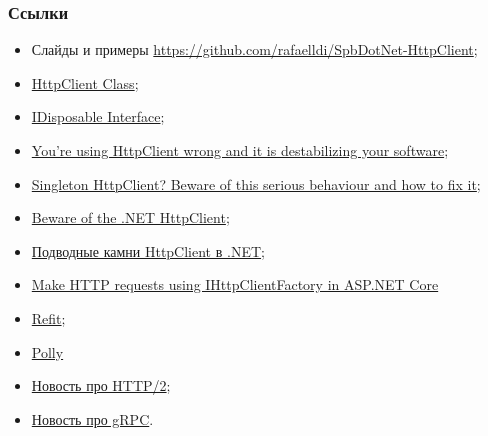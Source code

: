 \documentclass{beamer}
\begin{document}
\begin{frame}
\frametitle{Ссылки}
\begin{itemize}
	\item Слайды и примеры \href{https://github.com/rafaelldi/SpbDotNet-HttpClient}{https://github.com/rafaelldi/SpbDotNet-HttpClient};
	\item \href{https://docs.microsoft.com/en-us/dotnet/api/system.net.http.httpclient?view=netcore-2.2}{HttpClient Class};
	\item \href{https://docs.microsoft.com/en-us/dotnet/api/system.idisposable?view=netcore-2.2}{IDisposable Interface};
	\item \href{https://aspnetmonsters.com/2016/08/2016-08-27-httpclientwrong/}{You're using HttpClient wrong and it is destabilizing your software};
	\item \href{https://byterot.blogspot.com/2016/07/singleton-httpclient-dns.html}{Singleton HttpClient? Beware of this serious behaviour and how to fix it};
	\item \href{https://nima-ara-blog.azurewebsites.net/beware-of-the-net-httpclient/}{Beware of the .NET HttpClient};
	\item \href{https://habr.com/en/post/424873/}{Подводные камни HttpClient в .NET};
	\item \href{https://docs.microsoft.com/en-us/aspnet/core/fundamentals/http-requests?view=aspnetcore-2.2}{Make HTTP requests using IHttpClientFactory in ASP.NET Core}
	\item \href{https://github.com/reactiveui/refit}{Refit};
	\item \href{https://github.com/App-vNext/Polly}{Polly}
	\item \href{https://devblogs.microsoft.com/dotnet/announcing-net-core-3-0-preview-6/}{Новость про HTTP/2};
	\item \href{https://devblogs.microsoft.com/aspnet/asp-net-core-and-blazor-updates-in-net-core-3-0-preview-6/}{Новость про gRPC}.
\end{itemize}
\end{frame}
\end{document}
